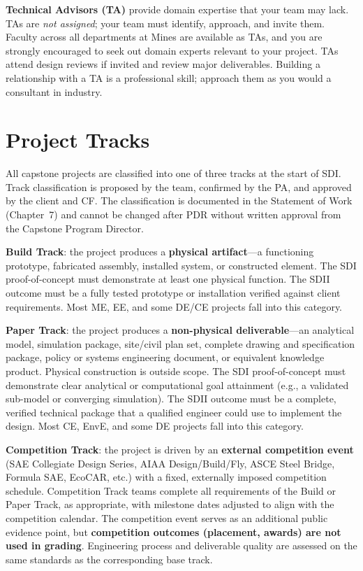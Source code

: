 \textbf{Technical Advisors (TA)} provide domain expertise that your team may lack. TAs are \emph{not assigned}; your team must identify, approach, and invite them. Faculty across all departments at Mines are available as TAs, and you are strongly encouraged to seek out domain experts relevant to your project. TAs attend design reviews if invited and review major deliverables. Building a relationship with a TA is a professional skill; approach them as you would a consultant in industry.


\section{Project Tracks}
All capstone projects are classified into one of three tracks at the start of SDI. Track classification is proposed by the team, confirmed by the PA, and approved by the client and CF. The classification is documented in the Statement of Work (Chapter~7) and cannot be changed after PDR without written approval from the Capstone Program Director.

\textbf{Build Track}: the project produces a \textbf{physical artifact}---a functioning prototype, fabricated assembly, installed system, or constructed element. The SDI proof-of-concept must demonstrate at least one physical function. The SDII outcome must be a fully tested prototype or installation verified against client requirements. Most ME, EE, and some DE/CE projects fall into this category.

\textbf{Paper Track}: the project produces a \textbf{non-physical deliverable}---an analytical model, simulation package, site/civil plan set, complete drawing and specification package, policy or systems engineering document, or equivalent knowledge product. Physical construction is outside scope. The SDI proof-of-concept must demonstrate clear analytical or computational goal attainment (e.g., a validated sub-model or converging simulation). The SDII outcome must be a complete, verified technical package that a qualified engineer could use to implement the design. Most CE, EnvE, and some DE projects fall into this category.

\textbf{Competition Track}: the project is driven by an \textbf{external competition event} (SAE Collegiate Design Series, AIAA Design/Build/Fly, ASCE Steel Bridge, Formula SAE, EcoCAR, etc.) with a fixed, externally imposed competition schedule. Competition Track teams complete all requirements of the Build or Paper Track, as appropriate, with milestone dates adjusted to align with the competition calendar. The competition event serves as an additional public evidence point, but \textbf{competition outcomes (placement, awards) are not used in grading}. Engineering process and deliverable quality are assessed on the same standards as the corresponding base track.

